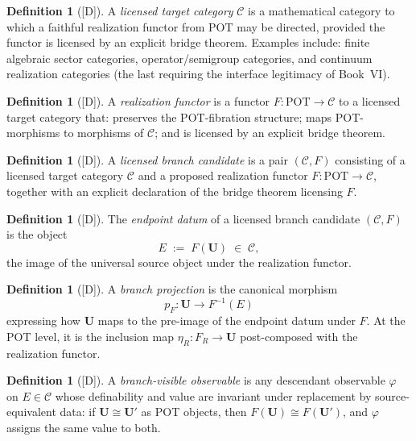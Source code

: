 \documentclass[12pt,oneside]{amsbook}
\theoremstyle{plain}
\theoremstyle{definition}
\newtheorem{definition}[theorem]{Definition}
\theoremstyle{remark}
\newcommand{\status}[1]{\textup{[#1]}}
\begin{document}
\begin{definition}[\status{D}]\label{def:target-category}
A \emph{licensed target category} $\mathcal{C}$ is a mathematical
category to which a faithful realization functor from $\mathrm{POT}$
may be directed, provided the functor is licensed by an explicit
bridge theorem.  Examples include: finite algebraic sector categories,
operator/semigroup categories, and continuum realization categories
(the last requiring the interface legitimacy of Book~VI).
\end{definition}

\begin{definition}[\status{D}]\label{def:realization-functor}
A \emph{realization functor} is a functor $F: \mathrm{POT} \to
\mathcal{C}$ to a licensed target category that: preserves the
POT-fibration structure; maps POT-morphisms to morphisms of
$\mathcal{C}$; and is licensed by an explicit bridge theorem.
\end{definition}

\begin{definition}[\status{D}]\label{def:branch-candidate}
A \emph{licensed branch candidate} is a pair $(\mathcal{C}, F)$
consisting of a licensed target category $\mathcal{C}$ and a
proposed realization functor $F: \mathrm{POT} \to \mathcal{C}$,
together with an explicit declaration of the bridge theorem licensing
$F$.
\end{definition}

\begin{definition}[\status{D}]\label{def:endpoint-datum}
The \emph{endpoint datum} of a licensed branch candidate
$(\mathcal{C}, F)$ is the object
\[
  E \;:=\; F(\mathbf{U}) \;\in\; \mathcal{C},
\]
the image of the universal source object under the realization functor.
\end{definition}

\begin{definition}[\status{D}]\label{def:branch-projection}
A \emph{branch projection} is the canonical morphism
\[
  p_F: \mathbf{U} \to F^{-1}(E)
\]
expressing how $\mathbf{U}$ maps to the pre-image of the endpoint
datum under $F$.  At the POT level, it is the inclusion map
$\eta_R: F_R \to \mathbf{U}$ post-composed with the realization functor.
\end{definition}

\begin{definition}[\status{D}]\label{def:branch-visible}
A \emph{branch-visible observable} is any descendant observable
$\varphi$ on $E \in \mathcal{C}$ whose definability and value are
invariant under replacement by source-equivalent data: if $\mathbf{U}
\cong \mathbf{U}'$ as POT objects, then $F(\mathbf{U}) \cong
F(\mathbf{U}')$, and $\varphi$ assigns the same value to both.
\end{definition}
\end{document}
